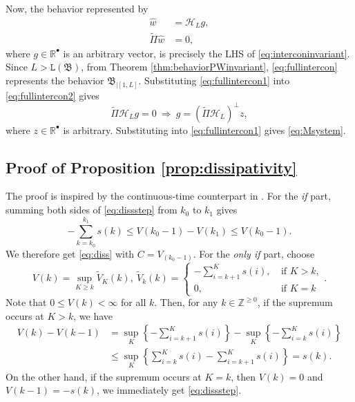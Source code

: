\documentclass[11pt,print,draftcls,onecolumn,romanappendices]{ieeecolor}
\newcommand{\R}{\mathbb{R}}
\newcommand{\Znn}[1]{\mathbb{Z}^{\geq0}_{#1}}
\newcommand{\lag}[1]{\mathtt{L}\left(#1\right)}
\newcommand{\B}{\mathfrak{B}}
\newcommand{\Hk}{\mathcal{H}}
\newcommand{\bint}[1]{{|[#1]}}
\begin{document}
Now, the behavior represented by 
\begin{subequations}\label{eq:fullintercon}
	\begin{align}
		\hat{w}&=\Hk_{L}g,\label{eq:fullintercon1} \\
		\widetilde{\Pi}\hat{w}&=0,\label{eq:fullintercon2}
	\end{align}
\end{subequations}
where $g\in\R^\bullet$ is an arbitrary vector, is precisely the LHS of \eqref{eq:interconinvariant}. Since $L>\lag{\B}$, from Theorem \ref{thm:behaviorPWinvariant}, \eqref{eq:fullintercon} represents the behavior $\B_\bint{1,L}$. Substituting \eqref{eq:fullintercon1} into \eqref{eq:fullintercon2} gives
\begin{equation}
	\widetilde{\Pi}\Hk_{L}g=0 \ \Rightarrow \ g=(\widetilde{\Pi}\Hk_{L})^\perp z,
\end{equation}
where $z\in\R^\bullet$ is arbitrary. Substituting into \eqref{eq:fullintercon1} gives \eqref{eq:Msystem}.
\subsection{Proof of Proposition \ref{prop:dissipativity}}\label{appx:proofprop:dissipativity}
The proof is inspired by the continuous-time counterpart in \cite{Willems:2007a}. For the \emph{if} part, summing both sides of \eqref{eq:dissstep} from $k_0$ to $k_1$ gives 
\begin{equation}\label{eq:disssum}
	-\sum_{k=k_0}^{k_1}s(k)\leq V(k_0-1)-V(k_1)\leq V(k_0-1).
\end{equation}
We therefore get \eqref{eq:diss} with $C=V_(k_0-1)$. For the \emph{only if} part, choose
\begin{equation*}
	V(k)=\sup_{K\geq k} \widetilde{V}_K(k), \ \widetilde{V}_k(k)=\begin{cases}
		 -\sum_{i=k+1}^{K}s(i), \ &\text{if } K>k,\\
		0, &  \text{if } K=k
	\end{cases}.
\end{equation*}
Note that $0\leq V(k)<\infty$ for all $k$. Then, for any $k\in\Znn{}$, if the supremum occurs at $K>k$, we have
\begin{align*}
	V(k)-V(k-1)&=\sup_{K}\left\{-\sum_{i=k+1}^{K}s(i)\right\}-\sup_{K}\left\{-\sum_{i=k}^{K}s(i)\right\}\\
	&\leq\sup_{K}\left\{\sum_{i=k}^{K}s(i)-\sum_{i=k+1}^{K}s(i)\right\}=s(k).
\end{align*}
On the other hand, if the supremum occurs at $K=k$, then $V(k)=0$ and $V(k-1)=-s(k)$, we immediately get \eqref{eq:dissstep}.
\end{document}
